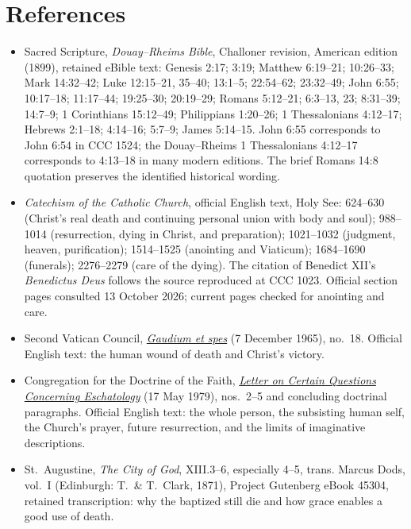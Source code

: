 \section{References}
\begingroup\small
\begin{itemize}[leftmargin=1.25em,itemsep=0.2em]
\item Sacred Scripture, \emph{Douay--Rheims Bible}, Challoner revision, American edition (1899), retained eBible text: Genesis 2:17; 3:19; Matthew 6:19--21; 10:26--33; Mark 14:32--42; Luke 12:15--21, 35--40; 13:1--5; 22:54--62; 23:32--49; John 6:55; 10:17--18; 11:17--44; 19:25--30; 20:19--29; Romans 5:12--21; 6:3--13, 23; 8:31--39; 14:7--9; 1 Corinthians 15:12--49; Philippians 1:20--26; 1 Thessalonians 4:12--17; Hebrews 2:1--18; 4:14--16; 5:7--9; James 5:14--15. John 6:55 corresponds to John 6:54 in CCC 1524; the Douay--Rheims 1 Thessalonians 4:12--17 corresponds to 4:13--18 in many modern editions. The brief Romans 14:8 quotation preserves the identified historical wording.
\item \emph{Catechism of the Catholic Church}, official English text, Holy See: 624--630 (Christ's real death and continuing personal union with body and soul); 988--1014 (resurrection, dying in Christ, and preparation); 1021--1032 (judgment, heaven, purification); 1514--1525 (anointing and Viaticum); 1684--1690 (funerals); 2276--2279 (care of the dying). The citation of Benedict XII's \emph{Benedictus Deus} follows the source reproduced at CCC 1023. Official section pages consulted 13 October 2026; current pages checked for anointing and care.
\item Second Vatican Council, \href{https://www.vatican.va/archive/hist_councils/ii_vatican_council/documents/vat-ii_const_19651207_gaudium-et-spes_en.html}{\emph{Gaudium et spes}} (7 December 1965), no.~18. Official English text: the human wound of death and Christ's victory.
\item Congregation for the Doctrine of the Faith, \href{https://www.vatican.va/roman_curia/congregations/cfaith/documents/rc_con_cfaith_doc_19790517_escatologia_en.html}{\emph{Letter on Certain Questions Concerning Eschatology}} (17 May 1979), nos.~2--5 and concluding doctrinal paragraphs. Official English text: the whole person, the subsisting human self, the Church's prayer, future resurrection, and the limits of imaginative descriptions.
\item St.~Augustine, \emph{The City of God}, XIII.3--6, especially 4--5, trans. Marcus Dods, vol.~I (Edinburgh: T.\ \& T.\ Clark, 1871), Project Gutenberg eBook 45304, retained transcription: why the baptized still die and how grace enables a good use of death.

\end{itemize}
